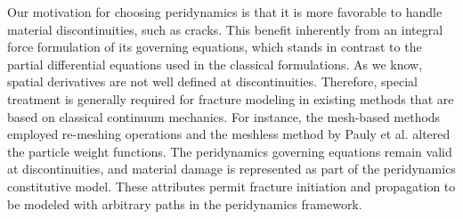 Our motivation for choosing peridynamics is that it is more favorable to handle material discontinuities, such as cracks.
This benefit inherently from an integral force formulation of its governing equations, which stands in contrast to the partial differential equations used in the classical formulations.
As we know, spatial derivatives are not well defined at discontinuities. Therefore, special treatment is generally required for fracture modeling in existing methods that are based on classical continuum mechanics. For instance, the mesh-based methods \cite{O'Brien:1999:GMA:311535.311550,O'Brien:2002:GMA:566654.566579} employed re-meshing operations and the meshless method by Pauly et al. \cite{Pauly:2005:MAF:1073204.1073296} altered the particle weight functions. The peridynamics governing equations remain valid at discontinuities, and material damage is represented as part of the peridynamics constitutive model. These attributes permit fracture initiation and propagation to be modeled with arbitrary paths in the peridynamics framework.

